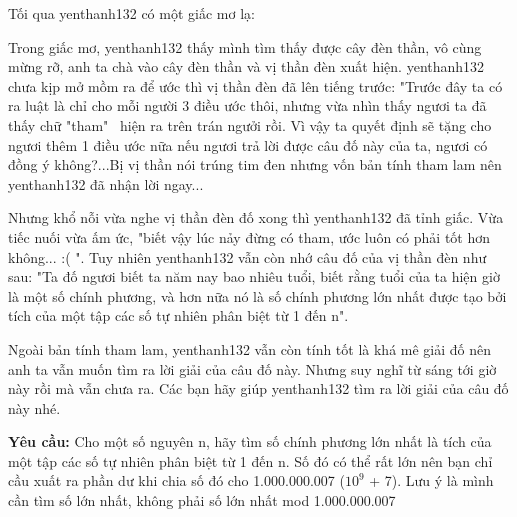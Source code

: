 Tối qua   yenthanh132   có một giấc mơ lạ:  

Trong giấc mơ, yenthanh132 thấy mình tìm thấy được cây đèn thần, vô cùng mừng rỡ, anh ta chà vào cây đèn thần và vị thần đèn xuất hiện. yenthanh132 chưa kịp mở mồm ra để ước thì vị thần đèn đã lên tiếng trước: "Trước đây ta có ra luật là chỉ cho mỗi người 3 điều ước thôi, nhưng vừa nhìn thấy ngươi ta đã thấy chữ "tham"  hiện ra trên trán ngưởi rồi. Vì vậy ta quyết định sẽ tặng cho ngươi thêm 1 điều ước nữa nếu ngươi trả lời được câu đố này của ta, ngươi có đồng ý không?...Bị vị thần nói trúng tim đen nhưng vốn bản tính tham lam nên yenthanh132 đã nhận lời ngay...

   Nhưng khổ nỗi vừa nghe vị thần đèn đố xong thì   yenthanh132   đã tỉnh giấc. Vừa tiếc nuối vừa ấm ức, "biết vậy lúc nảy đừng có tham, ước luôn có phải tốt hơn không... :( ". Tuy nhiên   yenthanh132   vẫn còn nhớ câu đố của vị thần đèn như sau: "Ta đố ngươi biết ta năm nay bao nhiêu tuổi, biết rằng tuổi của ta hiện giờ là một số chính phương, và hơn nữa nó là số chính phương lớn nhất được tạo bởi tích của một tập các số tự nhiên phân biệt từ 1 đến n".  

   Ngoài bản tính tham lam,   yenthanh132   vẫn còn tính tốt là khá mê giải đố nên anh ta vẫn muốn tìm ra lời giải của câu đố này. Nhưng suy nghĩ từ sáng tới giờ này rồi mà vẫn chưa ra. Các bạn hãy giúp   yenthanh132   tìm ra lời giải của câu đố này nhé.  

\textbf{    Yêu cầu:   }   Cho một số nguyên n, hãy tìm số chính phương lớn nhất là tích của một tập các số tự nhiên phân biệt từ 1 đến n. Số đó có thể rất lớn nên bạn chỉ cầu xuất ra phần dư khi chia số đó cho 1.000.000.007 ($10^{9}$   + 7). Lưu ý là mình cần tìm số lớn nhất, không phải số lớn nhất mod 1.000.000.007